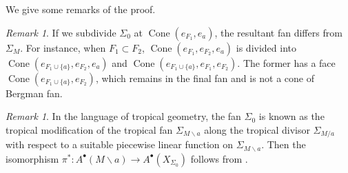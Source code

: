 \documentclass[a4paper,final,oneside]{amsart}
\theoremstyle{definition}
\theoremstyle{plain}
\theoremstyle{remark}
\newtheorem{remark}[definition]{Remark}
\DeclareMathOperator{\Cone}{Cone}
\begin{document}
We give some remarks of the proof.
\begin{remark}
If we subdivide \(\Sigma_0\) at \(\Cone(e_{F_1},e_a)\), the resultant fan differs from \(\Sigma_M\).
For instance, when \(F_1\subset F_2\), \(\Cone(e_{F_1},e_{F_2},e_a)\) is divided into \(\Cone(e_{F_1\cup\{a\}},e_{F_2},e_a)\) and \(\Cone(e_{F_1\cup\{a\}},e_{F_1},e_{F_2})\).
The former has a face \(\Cone(e_{F_1\cup\{a\}},e_{F_2})\), which remains in the final fan and is not a cone of Bergman fan.
\end{remark}
\begin{remark}
In the language of tropical geometry, the fan \(\Sigma_0\) is known as the tropical modification of the tropical fan \(\Sigma_{M\backslash a}\) along the tropical divisor \(\Sigma_{M/a}\) with respect to a suitable piecewise linear function on \(\Sigma_{M\backslash a}\).
Then the isomorphism \(\pi^*\colon A^{\bullet}(M\backslash a)\to A^{\bullet}(X_{\Sigma_0})\) follows from \cite[Theorem 6.4]{AP_23}.
\end{remark}
\end{document}
